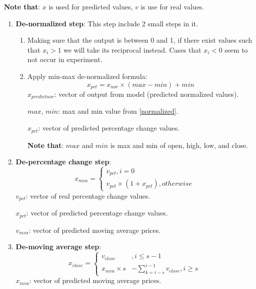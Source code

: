 \textbf{Note that}: $x$ is used for predicted values, $v$ is use for real values.
\begin{enumerate}
	\item \textbf{De-normalized step}: This step include 2 small steps in it.
	\begin{enumerate}
		\item Making sure that the output is between 0 and 1, if there exist
		values such that $x_{i}>1$ we will take its reciprocal instead. Cases that
		$x_{i}< 0$ seem to not occur in experiment.
		
		\item Apply min-max de-normalized formula:
		\begin{equation}
			x_{pct}=x_{nor}\times(max-min)+min \label{de-nor}
		\end{equation}
		$x_{predict nor}$: vector of output from model (predicted normalized
		values).
		
		$max$, $min$: max and min value from \autoref{normalized}.
		
		$x_{pct}$: vector of predicted percentage change values.
		
		\textbf{Note that}: $max$ and $min$ is max and min of open, high, low, and
		close.
	\end{enumerate}
	
	\item \textbf{De-percentage change step}:
	\begin{equation}
		x_{mva}=\left\{
		\begin{array}{l}
			v_{pct}, i=0                                    \\
			v_{pct} \times\left(1+x_{pct}\right), otherwise
		\end{array}\right. \label{de-pct}
	\end{equation}
	$v_{pct}$: vector of real percentage change values.
	
	$x_{pct}$: vector of predicted percentage change values.
	
	$v_{mva}$: vector of predicted moving average prices.
	
	\item \textbf{De-moving average step}:
	\begin{equation}
		x_{close}=
		\begin{cases}
			v_{close}       & , i \leq s-1                            \\
			x_{mva}\times s & - \sum_{k=i-s}^{i-1}v_{close}, i \geq s
		\end{cases}
		\label{de-moving}
	\end{equation}
	$x_{mva}$: vector of predicted moving average prices.
	

\end{enumerate}
